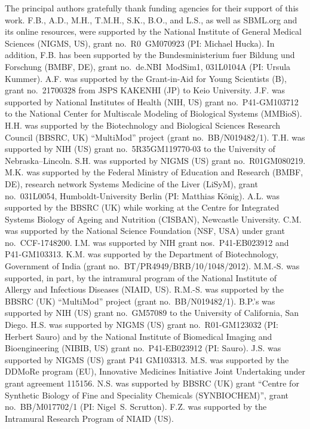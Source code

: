 \documentclass{sbml-paper}
\begin{document}
The principal authors gratefully thank funding agencies for their support of this work.
F.B., A.D., M.H., T.M.H., S.K., B.O., and L.S., as well as SBML.org and its online resources, were supported by the National Institute of General Medical Sciences (NIGMS, US), grant no.\ R0~GM070923 (PI: Michael Hucka).
In addition, F.B. has been supported by the Bundesministerium fuer Bildung und Forschung (BMBF, DE), grant no.\ de.NBI~ModSim1, 031L0104A (PI: Ursula Kummer).
A.F. was supported by the Grant-in-Aid for Young Scientists (B), grant no.\ 21700328 from JSPS KAKENHI (JP) to Keio University.
J.F. was supported by National Institutes of Health (NIH, US) grant no.\ P41-GM103712 to the National Center for Multiscale Modeling of Biological Systems (MMBioS).
H.H. was supported by the Biotechnology and Biological Sciences Research Council (BBSRC, UK) ``MultiMod'' project (grant no.\ BB/N019482/1).
T.H. was supported by NIH (US) grant no.\ 5R35GM119770-03 to the University of Nebraska--Lincoln.
S.H. was supported by NIGMS (US) grant no.\ R01GM080219.
M.K. was supported by the Federal Ministry of Education and Research (BMBF, DE), research network Systems Medicine of the Liver (LiSyM), grant no.\ 031L0054, Humboldt-University Berlin (PI: Matthias K\"{o}nig).
A.L. was supported by the BBSRC (UK) while working at the Centre for Integrated Systems Biology of Ageing and Nutrition (CISBAN), Newcastle University.
C.M. was supported by the National Science Foundation (NSF, USA) under grant no.\ CCF-1748200.
I.M. was supported by NIH grant nos.\ P41-EB023912 and P41-GM103313.
K.M. was supported by the Department of Biotechnology, Government of India (grant no.\ BT/PR4949/BRB/10/1048/2012).
M.M.-S. was supported, in part, by the intramural program of the National Institute of Allergy and Infectious Diseases (NIAID, US).
R.M.-S. was supported by the BBSRC (UK) ``MultiMod'' project (grant no.\ BB/N019482/1).
B.P.'s was supported by NIH (US) grant no.\ GM57089 to the University of California, San Diego.
H.S. was supported by NIGMS (US) grant no.\ R01-GM123032 (PI: Herbert Sauro) and by the National Institute of Biomedical Imaging and Bioengineering (NIBIB, US) grant no.\ P41-EB023912 (PI: Sauro).
J.S. was supported by NIGMS (US) grant P41 GM103313.
M.S. was supported by the DDMoRe program (EU), Innovative Medicines Initiative Joint Undertaking under grant agreement 115156.
N.S. was supported by BBSRC (UK) grant ``Centre for Synthetic Biology of Fine and Speciality Chemicals (SYNBIOCHEM)'', grant no.\ BB/M017702/1 (PI: Nigel~S. Scrutton).
F.Z. was supported by the Intramural Research Program of NIAID (US).
\end{document}
